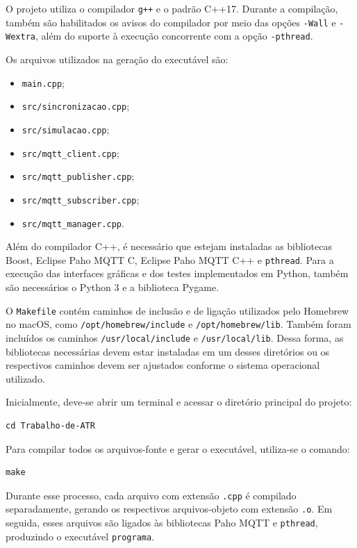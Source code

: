\documentclass[12pt]{article}
\begin{document}
O projeto utiliza o compilador \texttt{g++} e o padrão C++17. Durante a compilação, também são habilitados os avisos do compilador por meio das opções \texttt{-Wall} e \texttt{-Wextra}, além do suporte à execução concorrente com a opção \texttt{-pthread}.

Os arquivos utilizados na geração do executável são:

\begin{itemize}
    \item \texttt{main.cpp};
    \item \texttt{src/sincronizacao.cpp};
    \item \texttt{src/simulacao.cpp};
    \item \texttt{src/mqtt\_client.cpp};
    \item \texttt{src/mqtt\_publisher.cpp};
    \item \texttt{src/mqtt\_subscriber.cpp};
    \item \texttt{src/mqtt\_manager.cpp}.
\end{itemize}

Além do compilador C++, é necessário que estejam instaladas as bibliotecas Boost, Eclipse Paho MQTT C, Eclipse Paho MQTT C++ e \texttt{pthread}. Para a execução das interfaces gráficas e dos testes implementados em Python, também são necessários o Python 3 e a biblioteca Pygame.

O \texttt{Makefile} contém caminhos de inclusão e de ligação utilizados pelo Homebrew no macOS, como \texttt{/opt/homebrew/include} e \texttt{/opt/homebrew/lib}. Também foram incluídos os caminhos \texttt{/usr/local/include} e \texttt{/usr/local/lib}. Dessa forma, as bibliotecas necessárias devem estar instaladas em um desses diretórios ou os respectivos caminhos devem ser ajustados conforme o sistema operacional utilizado.

Inicialmente, deve-se abrir um terminal e acessar o diretório principal do projeto:

\begin{verbatim}
cd Trabalho-de-ATR
\end{verbatim}

Para compilar todos os arquivos-fonte e gerar o executável, utiliza-se o comando:

\begin{verbatim}
make
\end{verbatim}

Durante esse processo, cada arquivo com extensão \texttt{.cpp} é compilado separadamente, gerando os respectivos arquivos-objeto com extensão \texttt{.o}. Em seguida, esses arquivos são ligados às bibliotecas Paho MQTT e \texttt{pthread}, produzindo o executável \texttt{programa}.
\end{document}
